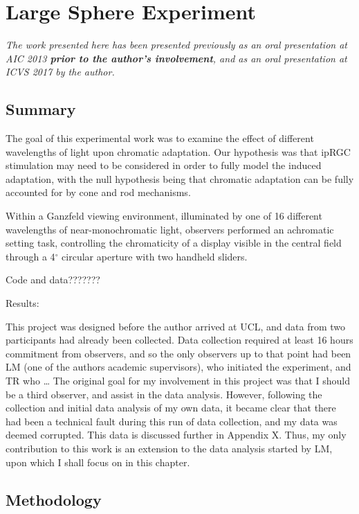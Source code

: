 \chapter{Large Sphere Experiment} %
\label{chap:LargeSphere}

\textit{The work presented here has been presented previously as an oral presentation at AIC 2013 \citep[p. 623]{macdonald_chromatic_2013} \textbf{prior to the author's involvement}, and as an oral presentation at ICVS 2017 \citep[p. 35/58]{jan_kremers_24th_2017} by the author.}

\section{Summary}

The goal of this experimental work was to examine the effect of different wavelengths of light upon chromatic adaptation. Our hypothesis was that \gls{ipRGC} stimulation may need to be considered in order to fully model the induced adaptation, with the null hypothesis being that chromatic adaptation can be fully accounted for by cone and rod mechanisms.

Within a Ganzfeld viewing environment, illuminated by one of 16 different wavelengths of near-monochromatic light, observers performed an achromatic setting task, controlling the chromaticity of a display visible in the central field through a 4$^{\circ}$ circular aperture with two handheld sliders.

Code and data??????? %

Results:

This project was designed before the author arrived at \gls{UCL}, and data from two participants had already been collected. Data collection required at least 16 hours commitment from observers, and so the only observers up to that point had been LM (one of the authors academic supervisors), who initiated the experiment, and TR who \dots %
The original goal for my involvement in this project was that I should be a third observer, and assist in the data analysis. However, following the collection and initial data analysis of my own data, it became clear that there had been a technical fault during this run of data collection, and my data was deemed corrupted. This data is discussed further in Appendix X. %
Thus, my only contribution to this work is an extension to the data analysis started by LM, upon which I shall focus on in this chapter.

\section{Methodology}

